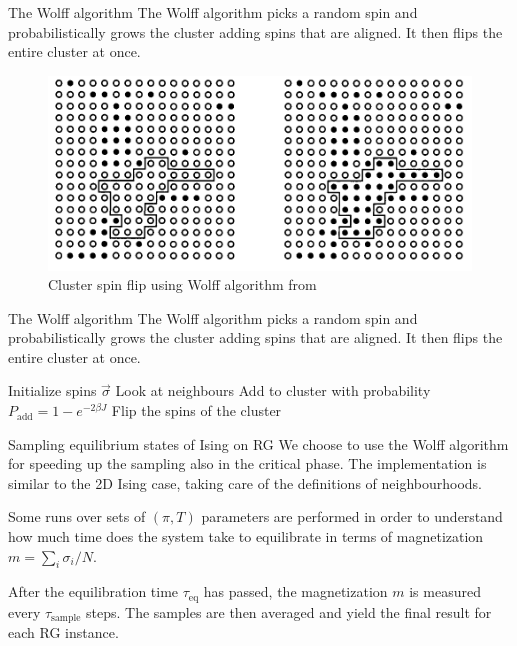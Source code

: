 \documentclass[handout]{beamer}
\begin{document}
\begin{frame}{The Wolff algorithm}
    The \alert{Wolff algorithm} picks a random spin and probabilistically grows
    the cluster adding spins that are aligned. It then flips the entire cluster
    at once. \cite[91]{newman_barkema}

    \begin{figure}
        \centering
        \includegraphics[width=.4\textwidth]{wolff.png}
        \caption{Cluster spin flip using Wolff algorithm from
        \cite[91]{newman_barkema}}
    \end{figure}
\end{frame}

\begin{frame}{The Wolff algorithm}
    The \alert{Wolff algorithm} picks a random spin and probabilistically grows
    the cluster adding spins that are aligned. It then flips the entire cluster
    at once. \cite[91]{newman_barkema}

    \begin{algorithm}[H]
        \begin{algorithmic}[1]
            \STATE Initialize spins $\vec \sigma$
                    \STATE Look at neighbours
                    \STATE Add to cluster with probability $P_{\text{add}} = 1-e^{-2\beta J}$
                    \ENDIF
                \ENDWHILE
                \STATE Flip the spins of the cluster
            \ENDWHILE
        \end{algorithmic}
        \caption{Wolff algorithm}
        \label{algo:wolff}
    \end{algorithm}
\end{frame}

\begin{frame}{Sampling equilibrium states of Ising on RG}
    We choose to use the \alert{Wolff algorithm} for speeding up the sampling
    also in the critical phase. The implementation is similar to the 2D Ising
    case, taking care of the definitions of neighbourhoods.

    Some runs over sets of $(\pi, T)$ parameters are performed in order to
    understand how much time does the system take to equilibrate in terms of
    magnetization $m=\sum_i \sigma_i / N$.

    After the equilibration time $\tau_{\text{eq}}$ has passed, the
    magnetization $m$ is measured every $\tau_{\text{sample}}$ steps. The
    samples are then averaged and yield the final result for each RG instance.
\end{frame}
\end{document}
